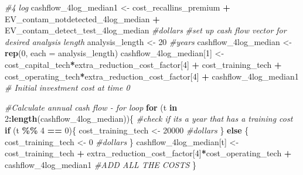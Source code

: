 \documentclass[
]{article}
\newenvironment{Shaded}{\begin{snugshade}}{\end{snugshade}}
\newcommand{\AttributeTok}[1]{\textcolor[rgb]{0.13,0.29,0.53}{#1}}
\newcommand{\CommentTok}[1]{\textcolor[rgb]{0.56,0.35,0.01}{\textit{#1}}}
\newcommand{\ControlFlowTok}[1]{\textcolor[rgb]{0.13,0.29,0.53}{\textbf{#1}}}
\newcommand{\DecValTok}[1]{\textcolor[rgb]{0.00,0.00,0.81}{#1}}
\newcommand{\FunctionTok}[1]{\textcolor[rgb]{0.13,0.29,0.53}{\textbf{#1}}}
\newcommand{\NormalTok}[1]{#1}
\newcommand{\OtherTok}[1]{\textcolor[rgb]{0.56,0.35,0.01}{#1}}
\newcommand{\SpecialCharTok}[1]{\textcolor[rgb]{0.81,0.36,0.00}{\textbf{#1}}}
\begin{document}
\begin{Shaded}
\begin{Highlighting}[]
\CommentTok{\#4 log}
\NormalTok{cashflow\_4log\_median1 }\OtherTok{\textless{}{-}}\NormalTok{ cost\_recallins\_premium }\SpecialCharTok{+}\NormalTok{ EV\_contam\_notdetected\_4log\_median }\SpecialCharTok{+}\NormalTok{ EV\_contam\_detect\_test\_4log\_median }\CommentTok{\#dollars}
\CommentTok{\#set up cash flow vector for desired analysis length}
\NormalTok{analysis\_length }\OtherTok{\textless{}{-}} \DecValTok{20} \CommentTok{\#years}
\NormalTok{cashflow\_4log\_median }\OtherTok{\textless{}{-}} \FunctionTok{rep}\NormalTok{(}\DecValTok{0}\NormalTok{, }\AttributeTok{each =}\NormalTok{ analysis\_length)}
\NormalTok{cashflow\_4log\_median[}\DecValTok{1}\NormalTok{] }\OtherTok{\textless{}{-}}\NormalTok{ cost\_capital\_tech}\SpecialCharTok{*}\NormalTok{extra\_reduction\_cost\_factor[}\DecValTok{4}\NormalTok{] }\SpecialCharTok{+}\NormalTok{ cost\_training\_tech }\SpecialCharTok{+}\NormalTok{ cost\_operating\_tech}\SpecialCharTok{*}\NormalTok{extra\_reduction\_cost\_factor[}\DecValTok{4}\NormalTok{] }\SpecialCharTok{+}\NormalTok{ cashflow\_4log\_median1   }\CommentTok{\# Initial investment cost at time 0}

\CommentTok{\#Calculate annual cash flow {-} for loop}
\ControlFlowTok{for}\NormalTok{ (t }\ControlFlowTok{in} \DecValTok{2}\SpecialCharTok{:}\FunctionTok{length}\NormalTok{(cashflow\_4log\_median))\{}
  \CommentTok{\#check if it\textquotesingle{}s a year that has a training cost}
  \ControlFlowTok{if}\NormalTok{ (t }\SpecialCharTok{\%\%} \DecValTok{4} \SpecialCharTok{==} \DecValTok{0}\NormalTok{)\{}
\NormalTok{    cost\_training\_tech }\OtherTok{\textless{}{-}} \DecValTok{20000} \CommentTok{\#dollars}
\NormalTok{  \} }\ControlFlowTok{else}\NormalTok{ \{}
\NormalTok{    cost\_training\_tech }\OtherTok{\textless{}{-}} \DecValTok{0} \CommentTok{\#dollars}
\NormalTok{  \}}
\NormalTok{  cashflow\_4log\_median[t] }\OtherTok{\textless{}{-}}\NormalTok{ cost\_training\_tech }\SpecialCharTok{+}\NormalTok{ extra\_reduction\_cost\_factor[}\DecValTok{4}\NormalTok{]}\SpecialCharTok{*}\NormalTok{cost\_operating\_tech }\SpecialCharTok{+}\NormalTok{ cashflow\_4log\_median1 }\CommentTok{\#ADD ALL THE COSTS}
\NormalTok{\}}



\end{Highlighting}
\end{Shaded}
\end{document}
